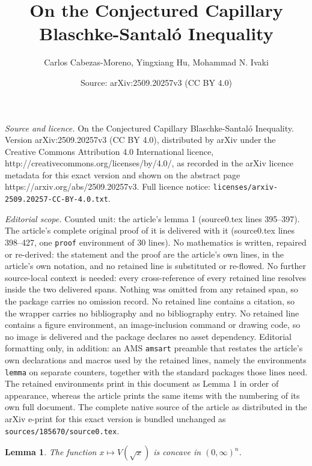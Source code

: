 \documentclass[10pt,a4paper]{amsart}
\title{On the Conjectured Capillary Blaschke-Santal\'o Inequality}
\author{Carlos Cabezas-Moreno, Yingxiang Hu, Mohammad N. Ivaki}
\date{Source: arXiv:2509.20257v3 (CC BY 4.0)}
\newtheorem{lemma}{Lemma}
\begin{document}
\maketitle

\noindent\emph{Source and licence.} On the Conjectured Capillary Blaschke-Santal\'o Inequality. Version arXiv:2509.20257v3 (CC BY 4.0), distributed by arXiv under the Creative Commons Attribution 4.0 International licence, http://creativecommons.org/licenses/by/4.0/, as recorded in the arXiv licence metadata for this exact version and shown on the abstract page https://arxiv.org/abs/2509.20257v3. Full licence notice: \texttt{licenses/arxiv-2509.20257-CC-BY-4.0.txt}.\par\smallskip

\noindent\textit{Editorial scope.} Counted unit: the article's lemma 1 (source0.tex lines 395--397). The article's complete original proof of it is delivered with it (source0.tex lines 398--427, one \texttt{proof} environment of 30 lines). No mathematics is written, repaired or re-derived: the statement and the proof are the article's own lines, in the article's own notation, and no retained line is substituted or re-flowed.  No further source-local context is needed: every cross-reference of every retained line resolves inside the two delivered spans.  Nothing was omitted from any retained span, so the package carries no omission record.  No retained line contains a citation, so the wrapper carries no bibliography and no bibliography entry.  No retained line contains a figure environment, an image-inclusion command or drawing code, so no image is delivered and the package declares no asset dependency.  Editorial formatting only, in addition: an AMS \texttt{amsart} preamble that restates the article's own declarations and macros used by the retained lines, namely the environments \texttt{lemma} on separate counters, together with the standard packages those lines need.  The retained environments print in this document as Lemma 1 in order of appearance, whereas the article prints the same items with the numbering of its own full document.  The complete native source of the article as distributed in the arXiv e-print for this exact version is bundled unchanged as \texttt{sources/185670/source0.tex}.
\begin{lemma}\label{lem 1} The function
 $x\mapsto V(\sqrt{x})$ is concave in $(0,\infty)^n$.
\end{lemma}
\end{document}
